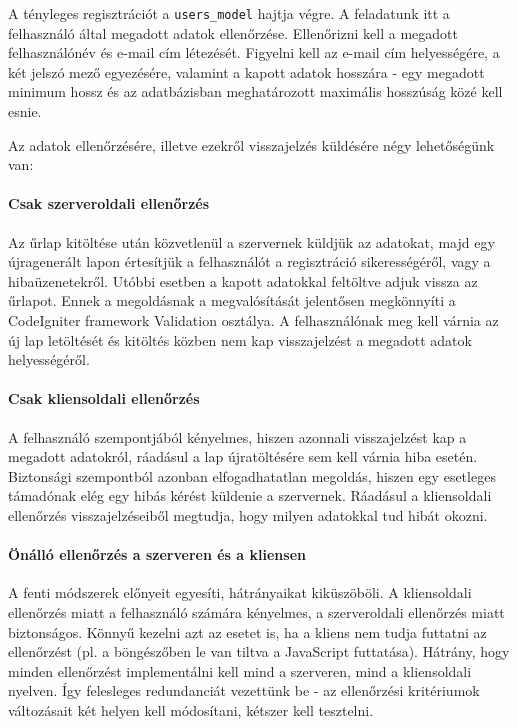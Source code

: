 \documentclass[12pt,a4paper,twoside]{article}
\begin{document}
A tényleges regisztrációt a \texttt{users\_model} hajtja végre. A feladatunk itt
a felhasználó által megadott adatok ellenőrzése. Ellenőrizni
kell a megadott felhasználónév és e-mail cím létezését. Figyelni kell az e-mail
cím helyességére, a két jelszó mező egyezésére, valamint a kapott adatok
hosszára - egy megadott minimum hossz és az adatbázisban meghatározott
maximális hosszúság közé kell esnie.

Az adatok ellenőrzésére, illetve ezekről visszajelzés küldésére négy
lehetőségünk van:

\paragraph{Csak szerveroldali ellenőrzés}
Az űrlap kitöltése után közvetlenül a szervernek küldjük az adatokat, majd egy
újragenerált lapon értesítjük a felhasználót a regisztráció sikerességéről, vagy
a hibaüzenetekről. Utóbbi esetben a kapott adatokkal feltöltve adjuk vissza az
űrlapot. Ennek a megoldásnak a megvalósítását jelentősen megkönnyíti a
CodeIgniter framework Validation osztálya\cite{CI-Val}. A felhasználónak meg kell várnia az új lap
letöltését és kitöltés közben nem kap visszajelzést a megadott adatok
helyességéről.

\paragraph{Csak kliensoldali ellenőrzés}
A felhasználó szempontjából kényelmes, hiszen azonnali visszajelzést kap a
megadott adatokról, ráadásul a lap újratöltésére sem kell várnia hiba
esetén. Biztonsági szempontból azonban elfogadhatatlan megoldás, hiszen egy
esetleges támadónak elég egy hibás kérést küldenie a szervernek. Ráadásul a
kliensoldali ellenőrzés visszajelzéseiből megtudja, hogy milyen adatokkal tud
hibát okozni.

\paragraph{Önálló ellenőrzés a szerveren és a kliensen}
A fenti módszerek előnyeit egyesíti, hátrányaikat kiküszöböli. A kliensoldali
ellenőrzés miatt a felhasználó számára kényelmes, a szerveroldali ellenőrzés
miatt biztonságos. Könnyű kezelni azt az esetet is, ha a kliens nem tudja
futtatni az ellenőrzést (pl. a böngészőben le van tiltva a JavaScript
futtatása). Hátrány, hogy minden ellenőrzést implementálni kell mind
a szerveren, mind a kliensoldali nyelven. Így felesleges redundanciát vezettünk
be - az ellenőrzési kritériumok változásait két helyen kell módosítani, kétszer
kell tesztelni.
\end{document}
